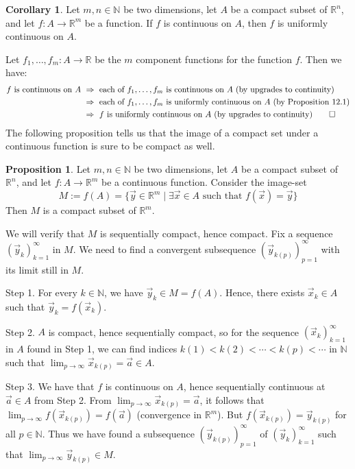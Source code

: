 \documentclass[11pt]{article}
\makeatletter
\theoremstyle{definition}
\newtheorem{prop}[thm]{Proposition}
\newtheorem{cor}[thm]{Corollary}
\newcommand{\N}{\ensuremath{\mathbb{N}}}
\newcommand{\R}{\ensuremath{\mathbb{R}}}
\newenvironment{pf}[1][\proofname]{\par
  \pushQED{\qed}%
  \normalfont \topsep0\p@\relax
  \trivlist
  \item[\hskip\labelsep\itshape
  #1\@addpunct{.}]\ignorespaces
}{%
  \popQED\endtrivlist\@endpefalse
}
\makeatother
\begin{document}
\begin{cor}
Let $m, n \in \N$ be two dimensions, let $A$ be a compact subset of $\R^n$, and let $f : A \to \R^m$ be a function. If $f$ is continuous on $A$, then $f$ is uniformly continuous on $A$.
\end{cor}
\begin{pf}
Let $f_1, \dots, f_m : A \to \R$ be the $m$ component functions for the function $f$. Then we have:
\begin{align*}
    \text{$f$ is continuous on $A$ } &\Rightarrow \text{ each of $f_1, \dots, f_m$ is continuous on $A$ (by upgrades to continuity)} \\
    &\Rightarrow \text{ each of $f_1, \dots, f_m$ is uniformly continuous on $A$ (by Proposition 12.1)} \\
    &\Rightarrow \text{ $f$ is uniformly continuous on $A$ (by upgrades to continuity)} \qedhere
\end{align*}
\end{pf}
The following proposition tells us that the image of a compact set under a continuous function is sure to be compact as well.
\begin{prop}
Let $m, n \in \N$ be two dimensions, let $A$ be a compact subset of $\R^n$, and let $f : A \to \R^m$ be a continuous function. Consider the image-set
\[ M := f(A) = \{ \vec{y} \in \R^m \mid \exists \vec{x} \in A \text{ such that } f(\vec{x}) = \vec{y} \} \]
Then $M$ is a compact subset of $\R^m$. 
\end{prop}
\begin{pf}
We will verify that $M$ is sequentially compact, hence compact. Fix a sequence $(\vec{y}_k)_{k=1}^\infty$ in $M$. We need to find a convergent subsequence $(\vec{y}_{k(p)})_{p=1}^\infty$ with its limit still in $M$.

{\sc Step 1.} For every $k \in \N$, we have $\vec{y}_k \in M = f(A)$. Hence, there exists $\vec{x}_k \in A$ such that $\vec{y}_k = f(\vec{x}_k)$.

{\sc Step 2.} $A$ is compact, hence sequentially compact, so for the sequence $(\vec{x}_k)_{k=1}^\infty$ in $A$ found in Step 1, we can find indices $k(1) < k(2) < \cdots < k(p) < \cdots$ in $\N$ such that $\lim_{p\to\infty} \vec{x}_{k(p)} = \vec{a} \in A$. 

{\sc Step 3.} We have that $f$ is continuous on $A$, hence sequentially continuous at $\vec{a} \in A$ from Step 2. From $\lim_{p\to\infty} \vec{x}_{k(p)} = \vec{a}$, it follows that $\lim_{p\to\infty} f(\vec{x}_{k(p)}) = f(\vec{a})$ (convergence in $\R^m$). But $f(\vec{x}_{k(p)}) = \vec{y}_{k(p)}$ for all $p \in \N$. Thus we have found a subsequence $(\vec{y}_{k(p)})_{p=1}^\infty$ of $(\vec{y}_k)_{k=1}^\infty$ such that $\lim_{p\to\infty} \vec{y}_{k(p)} \in M$.
\end{pf}
\end{document}
